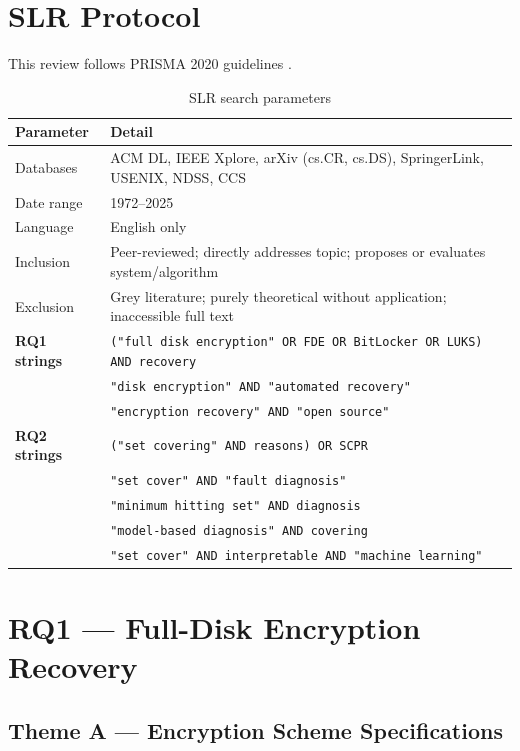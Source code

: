 \documentclass[11pt,a4paper]{report}
\begin{document}
\chapter{SLR Protocol}

This review follows PRISMA 2020 guidelines \citep{page2021}.

\begin{table}[htbp]
\centering
\caption{SLR search parameters}
\label{tab:slrprotocol}
\begin{tabular}{@{}ll@{}}
\toprule
\textbf{Parameter} & \textbf{Detail} \\
\midrule
Databases & ACM DL, IEEE Xplore, arXiv (cs.CR, cs.DS), SpringerLink, USENIX, NDSS, CCS \\
Date range & 1972--2025 \\
Language & English only \\
Inclusion & Peer-reviewed; directly addresses topic; proposes or evaluates system/algorithm \\
Exclusion & Grey literature; purely theoretical without application; inaccessible full text \\
\midrule
\textbf{RQ1 strings} & \texttt{("full disk encryption" OR FDE OR BitLocker OR LUKS) AND recovery} \\
 & \texttt{"disk encryption" AND "automated recovery"} \\
 & \texttt{"encryption recovery" AND "open source"} \\
\textbf{RQ2 strings} & \texttt{("set covering" AND reasons) OR SCPR} \\
 & \texttt{"set cover" AND "fault diagnosis"} \\
 & \texttt{"minimum hitting set" AND diagnosis} \\
 & \texttt{"model-based diagnosis" AND covering} \\
 & \texttt{"set cover" AND interpretable AND "machine learning"} \\
\bottomrule
\end{tabular}
\end{table}

\chapter{RQ1 --- Full-Disk Encryption Recovery}

\section{Theme A --- Encryption Scheme Specifications}
\end{document}
